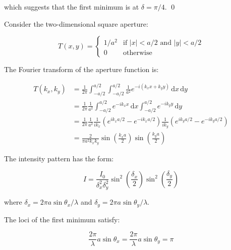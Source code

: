 \documentclass[12pt]{article}
\begin{document}
which suggests that the first minimum is at $\delta = \pi/4$.
\qed



Consider the two-dimensional square aperture:

\begin{equation}
    T(x, y) =
    \begin{cases}
        1/a^{2} & \text{if } \left\lvert x \right\rvert < a/2 \text{ and } \left\lvert y \right\rvert < a/2 \\
        0       & \text{otherwise}
    \end{cases}
\end{equation}

The Fourier transform of the aperture function is:

\begin{equation}
    \begin{split}
        T(k_{x}, k_{y}) &= \frac{1}{2\pi} \int_{-a/2}^{a/2} \int_{-a/2}^{a/2} \frac{1}{a^{2}} e^{-i(k_{x}x + k_{y}y)} \, \mathrm{d}x \, \mathrm{d}y \\
        &= \frac{1}{2\pi} \frac{1}{a^{2}} \int_{-a/2}^{a/2} e^{-ik_{x}x} \, \mathrm{d}x \int_{-a/2}^{a/2} e^{-ik_{y}y} \, \mathrm{d}y \\
        &= \frac{1}{2\pi} \frac{1}{a^{2}} \frac{1}{ik_{x}} \left( e^{ik_{x}a/2} - e^{-ik_{x}a/2} \right) \frac{1}{ik_{y}} \left( e^{ik_{y}a/2} - e^{-ik_{y}a/2} \right) \\
        &= \frac{2}{\pi a^{2} k_{x}k_{y}} \sin{\left( \frac{k_{x}a}{2} \right)} \sin{\left( \frac{k_{y}a}{2} \right)}
    \end{split}
\end{equation}

The intensity pattern has the form:

\begin{equation}
    I = \frac{I_{0}}{\delta_{x}^{2} \delta_{y}^{2}} \sin^{2}{\left( \frac{\delta_{x}}{2} \right)} \sin^{2}{\left( \frac{\delta_{y}}{2} \right)}
\end{equation}

where $\delta_{x} = 2\pi a \sin{\theta_{x}}/\lambda$ and $\delta_{y} = 2\pi a \sin{\theta_{y}}/\lambda$.

The loci of the first minimum satisfy:

\begin{equation}
    \frac{2\pi}{\lambda} a \sin{\theta_{x}} = \frac{2\pi}{\lambda} a \sin{\theta_{y}} = \pi
\end{equation}
\end{document}
